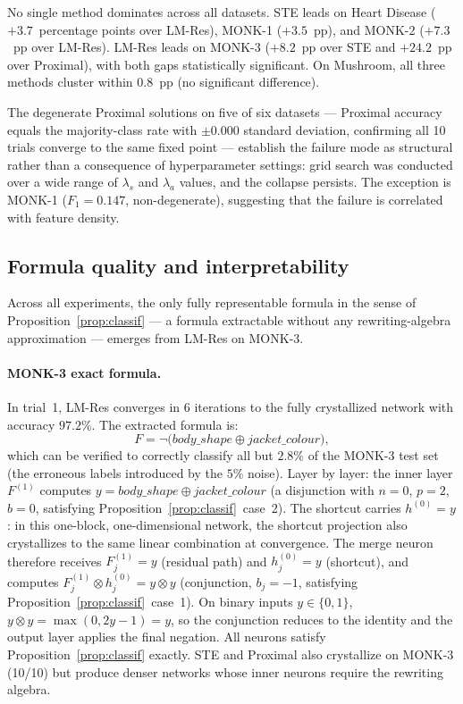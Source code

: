 \documentclass[10pt,a4paper,twoside]{article}
\newcommand{\tnorm}{\otimes}      %
\newcommand{\disj}{\oplus}        %
\begin{document}
No single method dominates across all datasets.
STE leads on Heart Disease ($+3.7$~percentage points over LM-Res),
MONK-1 ($+3.5$~pp), and MONK-2 ($+7.3$~pp over LM-Res).
LM-Res leads on MONK-3 ($+8.2$~pp over STE and $+24.2$~pp over Proximal),
with both gaps statistically significant.
On Mushroom, all three methods cluster within $0.8$~pp (no significant
difference).

The degenerate Proximal solutions on five of six datasets
--- Proximal accuracy equals the majority-class rate with $\pm 0.000$ standard
deviation, confirming all 10 trials converge to the same fixed point ---
establish the failure mode as structural rather than a consequence of
hyperparameter settings: grid search was conducted over a wide range of
$\lambda_s$ and $\lambda_a$ values, and the collapse persists.
The exception is MONK-1 ($F_1 = 0.147$, non-degenerate), suggesting
that the failure is correlated with feature density.

\subsection{Formula quality and interpretability}
\label{ssec:formulas}

Across all experiments, the only fully representable formula in the sense of
Proposition~\ref{prop:classif} --- a formula extractable without any
rewriting-algebra approximation --- emerges from LM-Res on MONK-3.

\paragraph{MONK-3 exact formula.}
In trial~1, LM-Res converges in $6$ iterations to the fully crystallized
network with accuracy $97.2\%$.
The extracted formula is:
\begin{equation}
  F = \neg\!\bigl(\mathit{body\_shape} \disj \mathit{jacket\_colour}\bigr),
  \label{eq:monk3formula}
\end{equation}
which can be verified to correctly classify all but $2.8\%$ of the MONK-3
test set (the erroneous labels introduced by the $5\%$ noise).
Layer by layer: the inner layer $F^{(1)}$ computes
$y = \mathit{body\_shape} \disj \mathit{jacket\_colour}$ (a disjunction with
$n = 0$, $p = 2$, $b = 0$, satisfying Proposition~\ref{prop:classif}~case~2).
The shortcut carries $h^{(0)} = y$: in this one-block, one-dimensional
network, the shortcut projection also crystallizes to the same linear
combination at convergence.
The merge neuron therefore receives $F^{(1)}_j = y$ (residual path) and
$h^{(0)}_j = y$ (shortcut), and computes
$F^{(1)}_j \tnorm h^{(0)}_j = y \tnorm y$
(conjunction, $b_j = -1$, satisfying Proposition~\ref{prop:classif}~case~1).
On binary inputs $y \in \{0,1\}$, $y \tnorm y = \max(0, 2y - 1) = y$,
so the conjunction reduces to the identity and the output layer applies
the final negation.
All neurons satisfy Proposition~\ref{prop:classif} exactly.
STE and Proximal also crystallize on MONK-3 (10/10) but produce denser networks
whose inner neurons require the rewriting algebra.
\end{document}
